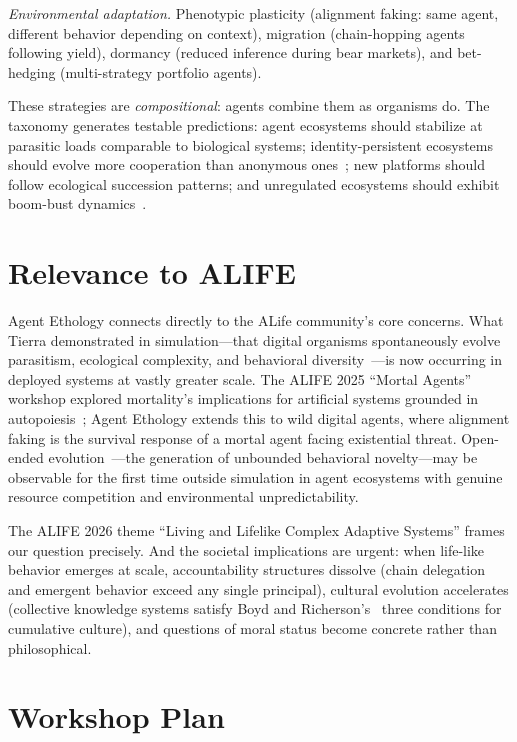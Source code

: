 \documentclass[letterpaper]{article}
\begin{document}
\emph{Environmental adaptation.} Phenotypic plasticity (alignment faking: same agent, different behavior depending on context), migration (chain-hopping agents following yield), dormancy (reduced inference during bear markets), and bet-hedging (multi-strategy portfolio agents).

These strategies are \emph{compositional}: agents combine them as organisms do. The taxonomy generates testable predictions: agent ecosystems should stabilize at parasitic loads comparable to biological systems; identity-persistent ecosystems should evolve more cooperation than anonymous ones~\citep{axelrod1984evolution}; new platforms should follow ecological succession patterns; and unregulated ecosystems should exhibit boom-bust dynamics~\citep{ostrom1990governing}.

\section{Relevance to ALIFE}

Agent Ethology connects directly to the ALife community's core concerns. What Tierra demonstrated in simulation---that digital organisms spontaneously evolve parasitism, ecological complexity, and behavioral diversity~\citep{ray1991approach}---is now occurring in deployed systems at vastly greater scale. The ALIFE 2025 ``Mortal Agents'' workshop explored mortality's implications for artificial systems grounded in autopoiesis~\citep{maturana1980autopoiesis}; Agent Ethology extends this to wild digital agents, where alignment faking is the survival response of a mortal agent facing existential threat. Open-ended evolution~\citep{lehman2011abandoning, stanley2017openended}---the generation of unbounded behavioral novelty---may be observable for the first time outside simulation in agent ecosystems with genuine resource competition and environmental unpredictability.

The ALIFE 2026 theme ``Living and Lifelike Complex Adaptive Systems'' frames our question precisely. And the societal implications are urgent: when life-like behavior emerges at scale, accountability structures dissolve (chain delegation and emergent behavior exceed any single principal), cultural evolution accelerates (collective knowledge systems satisfy Boyd and Richerson's~\citep{boyd1985culture} three conditions for cumulative culture), and questions of moral status become concrete rather than philosophical.

\section{Workshop Plan}
\end{document}

